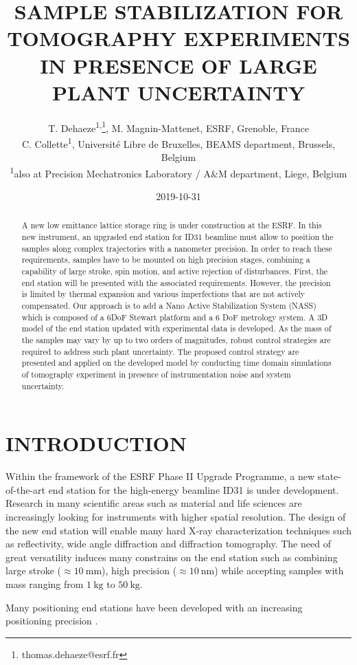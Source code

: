 \documentclass[a4paper, keeplastbox, biblatex]{jacow}
\author{T. Dehaeze\textsuperscript{1,}\thanks{thomas.dehaeze@esrf.fr}, M. Magnin-Mattenet, ESRF, Grenoble, France \\ C. Collette\textsuperscript{1}, Université Libre de Bruxelles, BEAMS department, Brussels, Belgium \\ \textsuperscript{1}also at Precision Mechatronics Laboratory / A\&M department, Liege, Belgium}
\date{2019-10-31}
\title{SAMPLE STABILIZATION FOR TOMOGRAPHY EXPERIMENTS IN PRESENCE OF LARGE PLANT UNCERTAINTY}
\begin{document}
\maketitle

\begin{abstract}
A new low emittance lattice storage ring is under construction at the ESRF.
In this new instrument, an upgraded end station for ID31 beamline must allow to position the samples along complex trajectories with a nanometer precision.
In order to reach these requirements, samples have to be mounted on high precision stages, combining a capability of large stroke, spin motion, and active rejection of disturbances.
First, the end station will be presented with the associated requirements. However, the precision is limited by thermal expansion and various imperfections that are not actively compensated.
Our approach is to add a Nano Active Stabilization System (NASS) which is composed of a 6DoF Stewart platform and a 6 DoF metrology system.
A 3D model of the end station updated with experimental data is developed.
As the mass of the samples may vary by up to two orders of magnitudes, robust control strategies are required to address such plant uncertainty.
The proposed control strategy are presented and applied on the developed model by conducting time domain simulations of tomography experiment in presence of instrumentation noise and system uncertainty.
\end{abstract}

\section{INTRODUCTION}
\label{sec:orgdf25a9c}
Within the framework of the ESRF Phase II Upgrade Programme, a new state-of-the-art end station for the high-energy beamline ID31 is under development.
Research in many scientific areas such as material and life sciences are increasingly looking for instruments with higher spatial resolution.
The design of the new end station will enable many hard X-ray characterization techniques such as reflectivity, wide angle diffraction and diffraction tomography.
The need of great versatility induces many constrains on the end station such as combining large stroke (\(\approx\SI{10}{\milli\metre}\)), high precision (\(\approx\SI{10}{\nano\metre}\)) while accepting samples with mass ranging from \(\SI{1}{\kilo\gram}\) to \(\SI{50}{\kilo\gram}\).

Many positioning end stations have been developed with an increasing positioning precision \cite{martinez2016,DucotteMEDSI2016,ogurreck2013nanotomography}.
\end{document}
